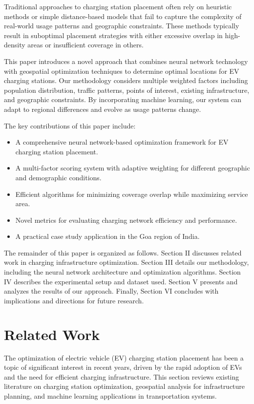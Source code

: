 \documentclass[journal]{IEEEtran}
\begin{document}
Traditional approaches to charging station placement often rely on heuristic methods or simple distance-based models that fail to capture the complexity of real-world usage patterns and geographic constraints. These methods typically result in suboptimal placement strategies with either excessive overlap in high-density areas or insufficient coverage in others.

This paper introduces a novel approach that combines neural network technology with geospatial optimization techniques to determine optimal locations for EV charging stations. Our methodology considers multiple weighted factors including population distribution, traffic patterns, points of interest, existing infrastructure, and geographic constraints. By incorporating machine learning, our system can adapt to regional differences and evolve as usage patterns change.

The key contributions of this paper include:
\begin{itemize}
    \item A comprehensive neural network-based optimization framework for EV charging station placement.
    \item A multi-factor scoring system with adaptive weighting for different geographic and demographic conditions.
    \item Efficient algorithms for minimizing coverage overlap while maximizing service area.
    \item Novel metrics for evaluating charging network efficiency and performance.
    \item A practical case study application in the Goa region of India.
\end{itemize}

The remainder of this paper is organized as follows. Section II discusses related work in charging infrastructure optimization. Section III details our methodology, including the neural network architecture and optimization algorithms. Section IV describes the experimental setup and dataset used. Section V presents and analyzes the results of our approach. Finally, Section VI concludes with implications and directions for future research.

\section{Related Work}
The optimization of electric vehicle (EV) charging station placement has been a topic of significant interest in recent years, driven by the rapid adoption of EVs and the need for efficient charging infrastructure. This section reviews existing literature on charging station optimization, geospatial analysis for infrastructure planning, and machine learning applications in transportation systems.
\end{document}
